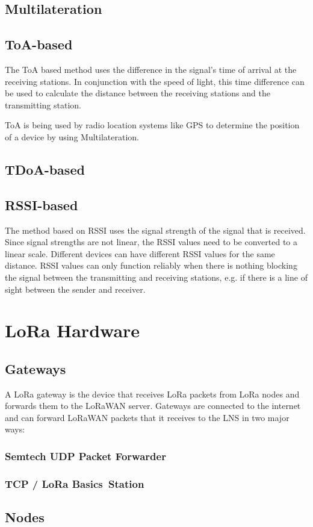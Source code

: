 \subsection{Multilateration}

\subsection{\acs{ToA}-based}

The \acf{ToA} based method uses the difference in the signal's time of arrival at the receiving stations.
In conjunction with the speed of light, this time difference can be used to calculate the distance between the receiving stations and the transmitting station.

\ac{ToA} is being used by radio location systems like \ac{GPS} to determine the position of a device by using Multilateration.

\subsection{\acs{TDoA}-based}



\subsection{\acs{RSSI}-based}

The method based on \acf{RSSI} uses the signal strength of the signal that is received.
Since signal strengths are not linear, the \ac{RSSI} values need to be converted to a linear scale.
Different devices can have different \ac{RSSI} values for the same distance.
\ac{RSSI} values can only function reliably when there is nothing blocking the signal between the transmitting and receiving stations, e.g. if there is a line of sight between the sender and receiver.

\section{\ac{LoRa} Hardware}

\subsection{Gateways}

A \ac{LoRa} gateway is the device that receives \ac{LoRa} packets from \ac{LoRa} nodes and forwards them to the \ac{LoRaWAN} server.
Gateways are connected to the internet and can forward \ac{LoRaWAN} packets that it receives to the \ac{LNS} in two major ways:

\subsubsection{Semtech \acs{UDP} Packet Forwarder}


\subsubsection{\acf{TCP} / LoRa Basics\texttrademark~Station}


\subsection{Nodes}